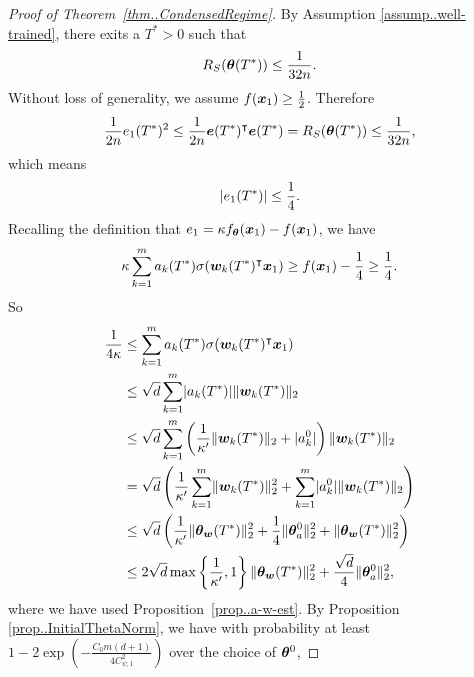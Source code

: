 \documentclass[twoside,11pt]{article}
\begin{document}
\begin{proof}[Proof of Theorem~\ref{thm..CondensedRegime}]
    By Assumption \ref{assump..well-trained}, there exits a $T^*>0$ such that
    \begin{equation*}
        R_S(\bm{\theta}(T^*))\leq \frac{1}{32n}.
    \end{equation*}
    Without loss of generality, we assume $f(\bm{x}_1)\geq \frac{1}{2}$.
    Therefore
    \begin{equation*}
        \frac{1}{2n}e_1(T^*)^2\leq \frac{1}{2n}\bm{e}(T^*)^\intercal\bm{e}(T^*)=R_S(\bm{\theta}(T^*))\leq\frac{1}{32n},
    \end{equation*}
    which means
    \begin{equation*}
        \lvert e_1(T^*)\rvert\leq \frac{1}{4}.
    \end{equation*}
    Recalling the definition that $e_1=\kappa f_{\bm{\theta}}(\bm{x}_1) - f(\bm{x}_1)$, we have
    \begin{equation*}
        \kappa\sum_{k=1}^m a_k(T^*)\sigma(\bm{w}_k(T^*)^\intercal\bm{x}_1) \geq f(\bm{x}_1) - \frac{1}{4} \geq \frac{1}{4}.
    \end{equation*}
    So
    \begin{equation*}
        \begin{aligned}
            \frac{1}{4\kappa}
             & \leq\sum_{k=1}^m a_k(T^*)\sigma(\bm{w}_k(T^*)^\intercal\bm{x}_1)                                        \\
             & \leq \sqrt{d}\sum_{k=1}^m\lvert a_k(T^*)\rvert\lVert\bm{w}_k(T^*)\rVert_2                                 \\
             & \leq  \sqrt{d}\sum_{k=1}^m\left(\frac{1}{\kappa'}\lVert\bm{w}_k(T^*)\rVert_2+\lvert a_k^0\rvert\right)\lVert\bm{w}_k(T^*)\rVert_2\\
             & = \sqrt{d}\left(\frac{1}{\kappa'}\sum_{k=1}^m\lVert\bm{w}_k(T^*)\rVert_2^2+\sum_{k=1}^m\lvert a_k^0\rvert\lVert\bm{w}_k(T^*)\rVert_2\right)\\
             & \leq
             \sqrt{d}\left(\frac{1}{\kappa'}\lVert\bm{\theta}_{\bm{w}}(T^*)\rVert_2^2+\frac{1}{4}\lVert\bm{\theta}_{a}^0\rVert_2^2+\lVert\bm{\theta}_{\bm{w}}(T^*)\rVert_2^2\right)\\
             & \leq
             2\sqrt{d}\max\left\{\frac{1}{\kappa'},1\right\}\lVert\bm{\theta}_{\bm{w}}(T^*)\rVert_2^2+\frac{\sqrt{d}}{4}\lVert\bm{\theta}_{a}^0\rVert_2^2,
        \end{aligned}
    \end{equation*}
    where we have used Proposition~\ref{prop..a-w-est}.
    By Proposition \ref{prop..InitialThetaNorm}, we have with probability at least $1-2\exp(-\frac{C_0m(d+1)}{4C_{\psi,1}^2})$ over the choice of $\bm{\theta}^0$,

\end{proof}
\end{document}
